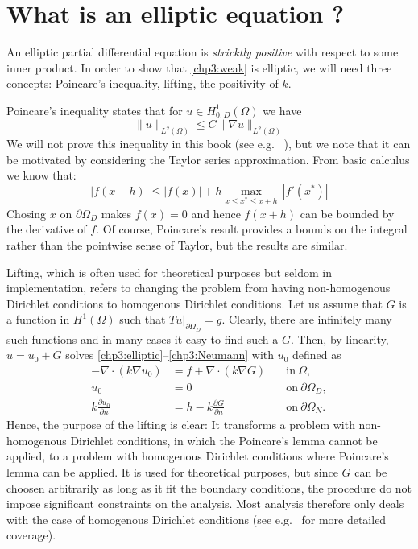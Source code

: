 \section{What is an elliptic equation ? }

An elliptic partial differential equation is \emph{stricktly positive} with respect to some inner product. 
In order to show that \eqref{chp3:weak} is elliptic, we will need three concepts: Poincare's inequality, lifting, the positivity of $k$. 



Poincare's inequality states that for $u\in  H^1_{0, D}(\Omega)$ we have
\begin{equation} 
\label{poincare}
\|u\|_{L^2(\Omega)}  \le C \| \nabla u\|_{L^2(\Omega)} 
\end{equation} 
We will not prove this inequality in this book (see e.g. ~\cite{evans2022partial}),  
but we note that it can be motivated by considering the Taylor series approximation. 
From basic calculus we know that: 
\[
|f(x+h)|  \le |f(x)| + h \max_{x \le x^* \le x+h } \,  |f'(x^*) | 
\]
Chosing $x$ on $\partial \Omega_D$ makes $f(x)=0$ and hence $f(x+h)$ can be bounded by the derivative
of $f$. Of course, Poincare's result provides a bounds on the integral rather than the pointwise sense 
of Taylor, but the results are similar. 

Lifting, which is often used for theoretical purposes but seldom in implementation, 
refers to changing the problem from having non-homogenous Dirichlet conditions to homogenous Dirichlet conditions.  
Let us assume that $G$ is a function in $H^1(\Omega)$ such that $T u |_{\partial \Omega_D} = g$. 
Clearly, there are infinitely many such functions and in many cases it easy to find such a $G$. 
Then, by linearity, 
$u= u_0 + G$ solves \eqref{chp3:elliptic}--\eqref{chp3:Neumann} with $u_0$ defined as     
\begin{eqnarray}
\label{chp3:elliptic:lift}
-\nabla\cdot(k\nabla u_0 )  &= f +\nabla\cdot(k\nabla G)  &\quad \textrm{in}\ \Omega,\\
\label{chp3:Dirichlet:lift}
u_0&= 0 &\quad \textrm{on}\ \partial\Omega_D, \\
\label{chp3:Neumann:lift}
k \frac{\partial u_0}{\partial n}&= h - k \frac{\partial G}{\partial n} &\quad \textrm{on}\ \partial\Omega_N . 
\end{eqnarray}
Hence, the purpose of the lifting is clear: It transforms a problem with non-homogenous Dirichlet conditions, in which the Poincare's lemma
cannot be applied, to a problem with homogenous Dirichlet conditions where Poincare's lemma can be applied. It is used for theoretical purposes, 
but since $G$ can be choosen arbitrarily as long as it fit the boundary conditions, the procedure do not impose significant constraints on
the analysis. Most analysis therefore only deals with the case of homogenous Dirichlet conditions (see e.g.~\cite{braess2007finite} for more 
detailed coverage). 

